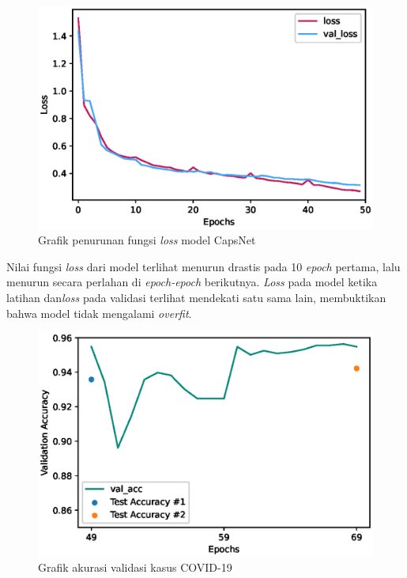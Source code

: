 \documentclass{article}
\begin{document}
   			\begin{figure}[H]
   				\centering
   				\includegraphics[scale=1]{analisis model/final_loss.eps}
   				\caption{Grafik penurunan fungsi \textit{loss} model CapsNet}
   			\end{figure}
   			
   			\par Nilai fungsi \textit{loss} dari model terlihat menurun drastis pada 10 \textit{epoch} pertama, lalu menurun secara perlahan di \textit{epoch-epoch} berikutnya. \textit{Loss} pada model ketika latihan dan\textit{loss} pada validasi terlihat mendekati satu sama lain, membuktikan bahwa model tidak mengalami \textit{overfit}.
   			
   			\begin{figure}[H]
   				\centering
   				\includegraphics[scale=1]{analisis model/covid_learn_acc.eps}
   				\caption{Grafik akurasi validasi kasus COVID-19}
   			\end{figure}
   			
\end{document}
